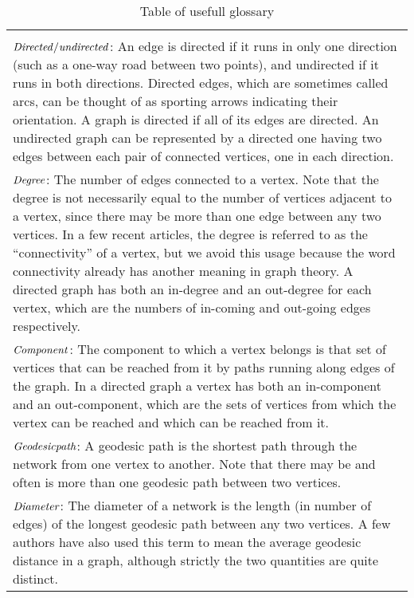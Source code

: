 \begin{table}
	\caption{Table of usefull glossary}
    \begin{tabularx}{\textwidth}{|X|}

    \hline
    	
		
		\\

		$\it{{Directed/undirected}}$: An edge is directed if it runs in only one direction (such as a one-way road between two points), and undirected if it runs in both directions. Directed edges, which are sometimes called arcs, can be thought of as sporting arrows indicating their orientation. A graph is directed if all of its edges are directed. An undirected graph can be represented by a directed one having two edges between each pair of connected vertices, one in each direction.
	
		\\

		$\it{{Degree}}$: The number of edges connected to a vertex. Note that the degree is not necessarily equal to the number of vertices adjacent to a vertex, since there may be more than one edge between any two vertices. In a few recent articles, the degree is referred to as the “connectivity” of a vertex, but we avoid this usage because the word connectivity already has another meaning in graph theory. A directed graph has both an in-degree and an out-degree for each vertex, which are the numbers of in-coming and out-going edges respectively.
	
		\\

		$\it{{Component}}$: The component to which a vertex belongs is that set of vertices that can be reached from it by paths running along edges of the graph. In a directed graph a vertex has both an in-component and an out-component, which are the sets of vertices from which the vertex can be reached and which can be reached from it.

		\\

		$\it{{Geodesic path}}$: A geodesic path is the shortest path through the network from one vertex to another. Note that there may be and often is more than one geodesic path between two vertices.

		\\

		$\it{{Diameter}}$: The diameter of a network is the length (in number of edges) of the longest geodesic path between any two vertices. A few authors have also used this term to mean the average geodesic distance in a graph, although strictly the two quantities are quite distinct.\\
    \hline
    \end{tabularx}
\end{table}


